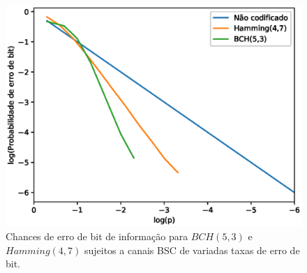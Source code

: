 \begin{figure}[!hb]
	\centering
    \captionsetup{justification=centering}
	\includegraphics[scale=0.6]{floats/bch-performance.eps}
	\caption{\label{fig:bch_performance}Chances de erro de bit de informação para $BCH(5,3)$ e $Hamming(4,7)$ sujeitos a canais BSC de variadas taxas de erro de bit.}
\end{figure}
